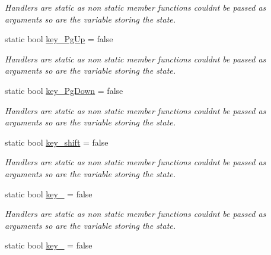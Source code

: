 \begin{DoxyCompactItemize}
\begin{DoxyCompactList}\small\item\em Handlers are static as non static member functions couldn\textquotesingle{}t be passed as arguments so are the variable storing the state. \end{DoxyCompactList}\item 
static bool \hyperlink{classcft_1_1Crafter_a92f23c00adff2309b06545cb7a524d68}{key\+\_\+\+Pg\+Up} = false\hypertarget{classcft_1_1Crafter_a92f23c00adff2309b06545cb7a524d68}{}\label{classcft_1_1Crafter_a92f23c00adff2309b06545cb7a524d68}

\begin{DoxyCompactList}\small\item\em Handlers are static as non static member functions couldn\textquotesingle{}t be passed as arguments so are the variable storing the state. \end{DoxyCompactList}\item 
static bool \hyperlink{classcft_1_1Crafter_a7f78d9d9a708cfb5f0ce1b4d21721702}{key\+\_\+\+Pg\+Down} = false\hypertarget{classcft_1_1Crafter_a7f78d9d9a708cfb5f0ce1b4d21721702}{}\label{classcft_1_1Crafter_a7f78d9d9a708cfb5f0ce1b4d21721702}

\begin{DoxyCompactList}\small\item\em Handlers are static as non static member functions couldn\textquotesingle{}t be passed as arguments so are the variable storing the state. \end{DoxyCompactList}\item 
static bool \hyperlink{classcft_1_1Crafter_ae97908b05847ba781d3ba8144b085d7b}{key\+\_\+shift} = false\hypertarget{classcft_1_1Crafter_ae97908b05847ba781d3ba8144b085d7b}{}\label{classcft_1_1Crafter_ae97908b05847ba781d3ba8144b085d7b}

\begin{DoxyCompactList}\small\item\em Handlers are static as non static member functions couldn\textquotesingle{}t be passed as arguments so are the variable storing the state. \end{DoxyCompactList}\item 
static bool \hyperlink{classcft_1_1Crafter_a4cd46febce4662a475ce4731c40e3763}{key\+\_} = false\hypertarget{classcft_1_1Crafter_a4cd46febce4662a475ce4731c40e3763}{}\label{classcft_1_1Crafter_a4cd46febce4662a475ce4731c40e3763}

\begin{DoxyCompactList}\small\item\em Handlers are static as non static member functions couldn\textquotesingle{}t be passed as arguments so are the variable storing the state. \end{DoxyCompactList}\item 
static bool \hyperlink{classcft_1_1Crafter_a084a0fd701eabdf854d17c62281e3e9f}{key\+\_} = false\hypertarget{classcft_1_1Crafter_a084a0fd701eabdf854d17c62281e3e9f}{}\label{classcft_1_1Crafter_a084a0fd701eabdf854d17c62281e3e9f}


\end{DoxyCompactItemize}
